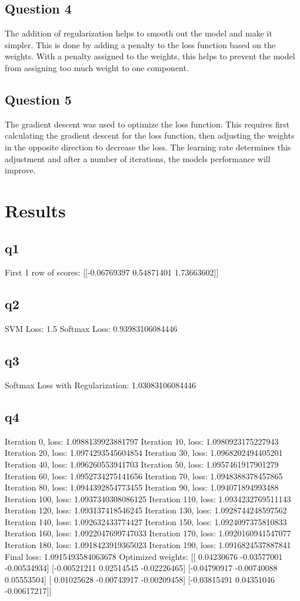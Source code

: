 \documentclass{article}
\begin{document}
\subsection{Question 4} The addition of regularization helps to smooth out the model and make it simpler. This is done by adding a penalty to the loss function based on the weights. With a penalty assigned to the weights, this helps to prevent the model from assigning too much weight to one component.

\subsection{Question 5} The gradient descent was used to optimize the loss function. This requires first calculating the gradient descent for the loss function, then adjusting the weights in the opposite direction to decrease the loss. The learning rate determines this adjustment and after a number of iterations, the models performance will improve. 
  
\section{Results}
\subsection{q1}First 1 row of scores:
 [[-0.06769397  0.54871401  1.73663602]]
 \subsection{q2}SVM Loss: 1.5
Softmax Loss: 0.93983106084446
\subsection{q3}Softmax Loss with Regularization: 1.03083106084446
\subsection{q4}
Iteration 0, loss: 1.0988139923881797
Iteration 10, loss: 1.0980923175227943
Iteration 20, loss: 1.0974293545604854
Iteration 30, loss: 1.0968202494405201
Iteration 40, loss: 1.096260553941703
Iteration 50, loss: 1.0957461917901279
Iteration 60, loss: 1.0952734275141656
Iteration 70, loss: 1.0948388378457865
Iteration 80, loss: 1.0944392854773455
Iteration 90, loss: 1.094071894993488
Iteration 100, loss: 1.0937340308086125
Iteration 110, loss: 1.0934232769511143
Iteration 120, loss: 1.093137418546245
Iteration 130, loss: 1.0928744248597562
Iteration 140, loss: 1.092632433774427
Iteration 150, loss: 1.0924097375810833
Iteration 160, loss: 1.0922047699747033
Iteration 170, loss: 1.0920160941547077
Iteration 180, loss: 1.0918423919365023
Iteration 190, loss: 1.0916824537887841
Final loss: 1.0915493584063678
Optimized weights:
 [[ 0.04230676 -0.03577001 -0.00534934]
 [-0.00521211  0.02514545 -0.02226465]
 [-0.04790917 -0.00740088  0.05553504]
 [ 0.01025628 -0.00743917 -0.00209458]
 [-0.03815491  0.04351046 -0.00617217]]
 
\end{document}
